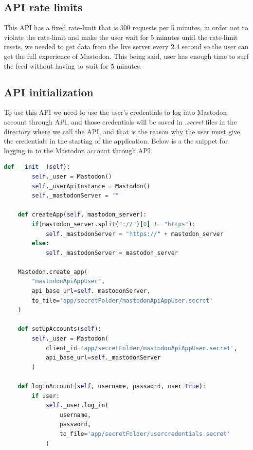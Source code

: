 \subsection{API rate limits}\label{ss:rate_lim}
This API has a fixed rate-limit that is 300 requests per 5 minutes, in order not to
violate the rate-limit and make the user wait for 5 minutes until the rate-limit resets, we
needed to get data from the live server every 2.4 second so the user can get the full
experience of Mastodon. This being said, user has enough time to surf the feed without having
to wait for 5 minutes.
\subsection{API initialization}\label{ss:api_init}
To use this API we need to use the user's credentials to log into Mastodon account through API, and those credentials will be saved in \textit{.secret} files in the directory where we call the API, and that is the reason why the user must give the credentials in the starting of the application. Below is a the snippet for logging in to the Mastodon account through API.
\\[5pt]
\begin{lstlisting}[language=python, caption={Logging in to Mastodon account through API}, captionpos=b ]
	def __init__(self):
		self._user = Mastodon()
		self._userApiInstance = Mastodon()
		self._mastodonServer = ""
	
	def createApp(self, mastodon_server):
		if(mastodon_server.split("://")[0] != "https"):
			self._mastodonServer = "https://" + mastodon_server
		else:
			self._mastodonServer = mastodon_server
	
	Mastodon.create_app(
		"mastodonApiAppUser",
		api_base_url=self._mastodonServer,
		to_file='app/secretFolder/mastodonApiAppUser.secret'
	)
	
	def setUpAccounts(self):
		self._user = Mastodon(
			client_id='app/secretFolder/mastodonApiAppUser.secret',
			api_base_url=self._mastodonServer
		)
	
	def loginAccount(self, username, password, user=True):
		if user:
			self._user.log_in(
				username,
				password,
				to_file='app/secretFolder/usercredentials.secret' 
			)
\end{lstlisting}
